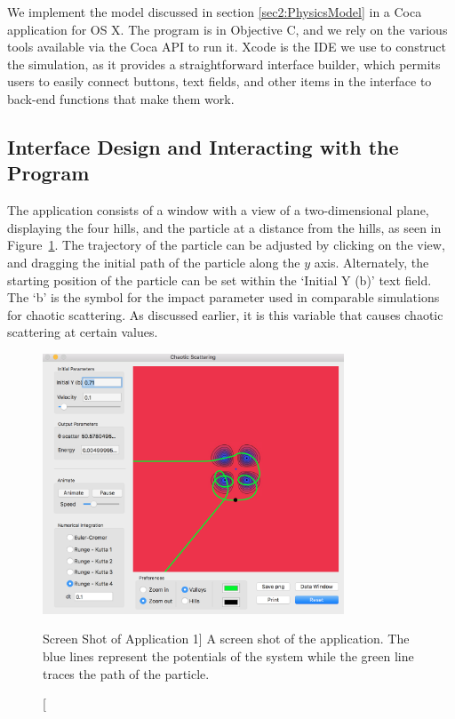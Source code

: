 \documentclass[12pt]{article} %
\begin{document}
We implement the model discussed in section \ref{sec2:PhysicsModel} in a Coca application for OS X. The program is in Objective C, and we rely on the various tools available via the Coca API to run it. Xcode is the IDE we use to construct the simulation, as it provides a straightforward interface builder, which permits users to easily connect buttons, text fields, and other items in the interface to back-end functions that make them work. 


\subsection{Interface Design and Interacting with the Program} \label{Intf Design+Interacting w program}

The application consists of a window with a view of a two-dimensional plane, displaying the four hills, and the particle at a distance from the hills, as seen in Figure~\ref{fig:choas}. The trajectory of the particle can be adjusted by clicking on the view, and dragging the initial path of the particle along the $y$ axis. Alternately, the starting position of the particle can be set within the `Initial Y (b)' text field. The `b' is the symbol for the impact parameter used in comparable simulations for chaotic scattering. As discussed earlier, it is this variable that causes chaotic scattering at certain values.  \\


\begin{figure}[h]
	\centering
	\includegraphics[width=0.8\textwidth]{image1.png}
	\caption
	[Screen Shot of Application 1]
	{A screen shot of the application. The blue lines represent the potentials of the system while the green line traces the path of the particle. }
	\label{fig:choas}
\end{figure}
\end{document}
